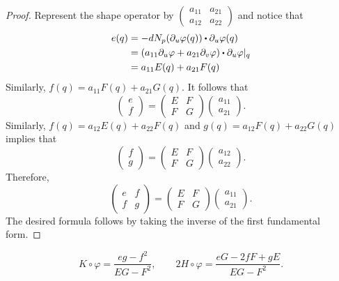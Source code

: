 \begin{proof}
    Represent the shape operator by $\begin{pmatrix}
        a_{11} & a_{21} \\ a_{12} & a_{22}
    \end{pmatrix}$ and notice that 
    \begin{align*}
        e(q) &= -dN_p(\partial_u \varphi(q)) \bigcdot \partial_u \varphi(q) \\
        &= (a_{11}\partial_u \varphi + a_{21}\partial_v \varphi) \bigcdot \partial_u \varphi |_q \\
        &= a_{11}E(q) + a_{21}F(q)
    \end{align*}
    Similarly, $f(q) = a_{11}F(q) + a_{21}G(q)$. It follows that
    $$\begin{pmatrix} e \\ f \end{pmatrix} = \begin{pmatrix} E & F \\ F & G \end{pmatrix}\begin{pmatrix} a_{11} \\ a_{21} \end{pmatrix}.$$
    Similarly, $f(q) = a_{12}E(q) + a_{22}F(q)$ and $g(q) = a_{12}F(q) + a_{22}G(q)$ implies that
    $$\begin{pmatrix} f \\ g \end{pmatrix} = \begin{pmatrix} E & F \\ F & G \end{pmatrix}\begin{pmatrix} a_{12} \\ a_{22} \end{pmatrix}.$$
    Therefore, 
    $$\begin{pmatrix} e & f \\ f & g \end{pmatrix} = \begin{pmatrix} E & F \\ F & G \end{pmatrix}\begin{pmatrix} a_{11} \\ a_{21} \end{pmatrix}.$$
    The desired formula follows by taking the inverse of the first fundamental form.
\end{proof}

\begin{corollary}
    $$K \circ \varphi = \frac{eg - f^2}{EG - F^2}, \qquad 2H \circ \varphi = \frac{eG - 2fF + gE}{EG - F^2}.$$
\end{corollary}

